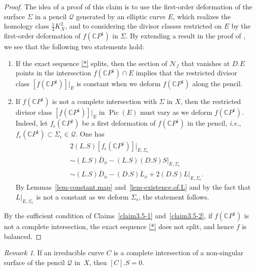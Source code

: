 \documentclass[11pt]{amsart}
\numberwithin{equation}{section}
\theoremstyle{definition}
\theoremstyle{plain}
\theoremstyle{remark}
\newtheorem{remark}[definition]{Remark}
\newcommand{\C}{\mathbb{C}}
\DeclareMathOperator{\Pic}{Pic}
\begin{document}
\begin{proof}
The idea of a proof of this claim is to use the first-order deformation of the surface $\Sigma$ in a pencil $\mathcal{Q}$ generated by an elliptic curve $E$, which realizes the homology class $\frac{1}{4}K^2_X$, and to considering the divisor classes restricted on $E$ by the first-order deformation of $f(\mathbb{C}P^1)$ in $\Sigma$.  By extending a result in the proof of \cite[Theorem~(4.f.3)]{griffiths1983infinitesimal}, we see that the following two statements hold: 
\begin{enumerate}
\item If the exact sequence \eqref{*} splits, then the section of $\mathcal{N}_f$ that vanishes at $D.E$ points in the intersection $f(\C P^1)\cap E$ implies that the restricted divisor class  $[f(\mathbb{C}P^1)]|_E$ is constant when we deform $f(\C P^1)$ along the pencil. 
\item If $f(\C P^1)$ is not a complete intersection with $\Sigma$ in $X$, then the restricted divisor class $[f(\mathbb{C}P^1)]|_E$ in $\Pic(E)$ must vary as we deform $f(\C P^1)$. Indeed, let $f_\epsilon(\C P^1)$ be a first deformation of $f(\C P^1)$ in the pencil, \textit{i.e.}, $f_\epsilon(\C P^1)\subset \Sigma_\epsilon\in \mathcal{Q}$. One has
\begin{equation*}
\begin{aligned}
      &2(L.S)\left[f_\epsilon(\C P^1)\right]|_{E,\Sigma_\epsilon}\\
    &\sim (L.S) \overline{D}_{\phi}- (L.S)(D.S)S|_{E,\Sigma_\epsilon}\\
    &\sim (L.S)\overline{D}_{\phi}-(D.S)\overline{L}_{\phi}+ 2(D.S)L|_{E,\Sigma_\epsilon}.
\end{aligned}
\end{equation*}
  By Lemmas~\ref{lem-constant.map} and~\ref{lem-existence.of.L} and by the fact that $L|_{E,\Sigma_\epsilon}$ is not a constant as we deform $\Sigma_\epsilon$, the statement follows.
\end{enumerate} 


By the sufficient condition of Claims~\ref{claim3.5-1} and~\ref{claim3.5-2}, if $f(\C P^1)$ is not a complete intersection, the exact sequence \eqref{*} does not split, and hence $f$ is balanced.
 \end{proof}

\begin{remark}
       If an irreducible curve $C$ is a complete intersection of a non-singular surface of the  pencil $\mathcal{Q}$ in~$X$, then $[C].S=0$.
    \end{remark}
\end{document}
